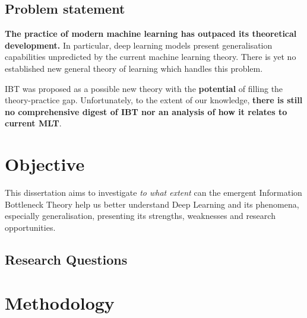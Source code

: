 \documentclass[
  a4paperpaper,
  a4paper,
  12pt,
  twoside,
  brazil,
  british,
  open=right]{scrbook}
\begin{document}
\hypertarget{problem-statement}{%
\subsection{Problem statement}\label{problem-statement}}

\textbf{The practice of modern machine learning has outpaced its
theoretical development.} In particular, deep learning models present
generalisation capabilities unpredicted by the current machine learning
theory. There is yet no established new general theory of learning which
handles this problem.

{IBT} was proposed as a possible new theory with the \textbf{potential}
of filling the theory-practice gap. Unfortunately, to the extent of our
knowledge, \textbf{there is still no comprehensive digest of {IBT} nor
an analysis of how it relates to current {MLT}}.

\hypertarget{objective}{%
\section{Objective}\label{objective}}

This dissertation aims to investigate \emph{to what extent} can the
emergent Information Bottleneck Theory help us better understand Deep
Learning and its phenomena, especially generalisation, presenting its
strengths, weaknesses and research opportunities.

\hypertarget{research-questions}{%
\subsection{Research Questions}\label{research-questions}}

\hypertarget{methodology}{%
\section{Methodology}\label{methodology}}
\end{document}
